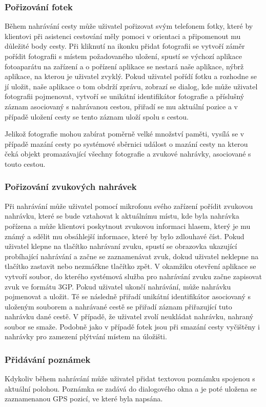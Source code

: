 \documentclass[czech,master,public,dept460,male,java,cpdeclaration]{diploma}
\begin{document}
\subsubsection{Pořizování fotek}
Během nahrávání cesty může uživatel pořizovat svým telefonem fotky, které by klientovi při asistenci
cestování měly pomoci v orientaci a připomenout mu důležité body cesty. Při kliknutí na ikonku přidat
fotografii se vytvoří záměr pořídit fotografii s místem požadovaného uložení, spustí se
výchozí aplikace fotoaparátu na zařízení a o pořízení aplikace se nestará naše
aplikace, nýbrž aplikace, na kterou je uživatel zvyklý. Pokud uživatel pořídí fotku a rozhodne se jí
uložit, naše aplikace o tom obdrží zprávu, zobrazí se dialog, kde může uživatel fotografii pojmenovat,
vytvoří se unikátní identifikátor fotografie a příslušný záznam asociovaný s nahrávanou cestou,
přiřadí se mu aktuální pozice a v případě uložení cesty se tento záznam uloží spolu s cestou.

Jelikož fotografie mohou zabírat poměrně velké množství paměti, vysílá se v případě mazání cesty po
systémové sběrnici událost o mazání cesty na kterou čeká objekt promazávající všechny fotografie
a zvukové nahrávky, asociované s touto cestou.

\subsubsection{Pořizování zvukových nahrávek}
Při nahrávání může uživatel pomocí mikrofonu svého zařízení pořídit zvukovou nahrávku, které se bude
vztahovat k aktuálnímu místu, kde byla nahrávka pořízena a může klientovi poskytnout zvukovou
informaci hlasem, který je mu známý a sdělit mu obsáhlejší informace, které by bylo zdlouhavé číst.
Pokud uživatel klepne na tlačítko nahrávaní zvuku, spustí se obrazovka ukazující probíhající nahrávání
a začne se zaznamenávat zvuk, dokud uživatel neklepne na tlačítko zastavit nebo nezmáčkne tlačítko zpět.
V okamžiku otevření aplikace se vytvoří soubor, do kterého systémová služba pro nahrávání
zvuku začne zapisovat zvuk ve formátu 3GP.
Pokud uživatel ukončí nahrávání, může nahrávku pojmenovat a uložit. Té se následně přiřadí unikátní
identifikátor asociovaný s uloženým souborem a nahrávané cestě se přiřadí záznam přiřazující tuto
nahrávku dané cestě. V případě, že uživatel zvolí neukládat nahrávku, nahraný soubor se smaže.
Podobně jako v případě fotek jsou při smazání cesty vyčištěny i nahrávky pro zamezení plýtvání místem
na úložišti.

\subsubsection{Přidávání poznámek}
Kdykoliv během nahrávání může uživatel přidat textovou poznámku spojenou s aktuální polohou.
 Poznámka se zadává do dialogového okna a je poté uložena se zaznamenanou GPS pozicí, ve které byla napsána.
\end{document}
